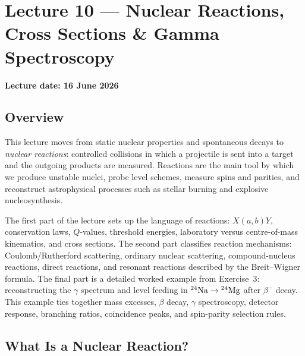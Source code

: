 
\section{Lecture 10 — Nuclear Reactions, Cross Sections \& Gamma Spectroscopy}
\label{sec:lec10}
\date{16 June 2026}

\noindent\textbf{\textcolor{doc}{Lecture date: 16 June 2026}}

\subsection*{Overview}
This lecture moves from static nuclear properties and spontaneous decays to
\emph{nuclear reactions}: controlled collisions in which a projectile is sent
into a target and the outgoing products are measured. Reactions are the main
tool by which we produce unstable nuclei, probe level schemes, measure spins and
parities, and reconstruct astrophysical processes such as stellar burning and
explosive nucleosynthesis.

The first part of the lecture sets up the language of reactions:
$X(a,b)Y$, conservation laws, $Q$-values, threshold energies, laboratory versus
centre-of-mass kinematics, and cross sections. The second part classifies
reaction mechanisms: Coulomb/Rutherford scattering, ordinary nuclear scattering,
compound-nucleus reactions, direct reactions, and resonant reactions described by
the Breit--Wigner formula. The final part is a detailed worked example from
Exercise~3: reconstructing the $\gamma$ spectrum and level feeding in
$\nucleus{Na}{24}\to\nucleus{Mg}{24}$ after $\beta^-$ decay. This example ties
together mass excesses, $\beta$ decay, $\gamma$ spectroscopy, detector response,
branching ratios, coincidence peaks, and spin-parity selection rules.

\subsection{What Is a Nuclear Reaction?}
\label{subsec:lec10:reaction_notation}

